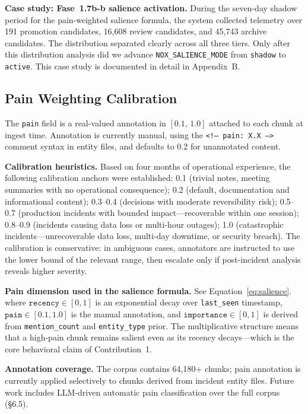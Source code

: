 \documentclass{article}
\begin{document}
\textbf{Case study: Fase~1.7b-b salience activation.} During the seven-day shadow period
for the pain-weighted salience formula, the system collected telemetry over 191 promotion
candidates, 16,608 review candidates, and 45,743 archive candidates. The distribution
separated clearly across all three tiers. Only after this distribution analysis did we
advance \texttt{NOX\_SALIENCE\_MODE} from \texttt{shadow} to \texttt{active}. This case
study is documented in detail in Appendix~B.

\subsection{Pain Weighting Calibration}

The \texttt{pain} field is a real-valued annotation in $[0.1,\,1.0]$ attached to each
chunk at ingest time. Annotation is currently manual, using the
\texttt{<!--~pain:~X.X~-->} comment syntax in entity files, and defaults to 0.2 for
unannotated content.

\textbf{Calibration heuristics.} Based on four months of operational experience, the
following calibration anchors were established: 0.1 (trivial notes, meeting summaries with
no operational consequence); 0.2 (default, documentation and informational content);
0.3--0.4 (decisions with moderate reversibility risk); 0.5--0.7 (production incidents with
bounded impact---recoverable within one session); 0.8--0.9 (incidents causing data loss or
multi-hour outages); 1.0 (catastrophic incidents---unrecoverable data loss, multi-day
downtime, or security breach). The calibration is conservative: in ambiguous cases,
annotators are instructed to use the lower bound of the relevant range, then escalate only
if post-incident analysis reveals higher severity.

\textbf{Pain dimension used in the salience formula.} See Equation~\ref{eq:salience}.
where $\texttt{recency} \in [0,1]$ is an exponential decay over \texttt{last\_seen}
timestamp, $\texttt{pain} \in [0.1,1.0]$ is the manual annotation, and
$\texttt{importance} \in [0,1]$ is derived from \texttt{mention\_count} and
\texttt{entity\_type} prior. The multiplicative structure means that a high-pain chunk
remains salient even as its recency decays---which is the core behavioral claim of
Contribution~1.

\textbf{Annotation coverage.} The corpus contains 64,180+ chunks; pain annotation is
currently applied selectively to chunks derived from incident entity files. Future work
includes LLM-driven automatic pain classification over the full corpus (\S6.5).
\end{document}
